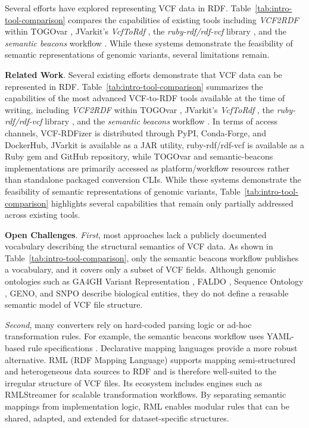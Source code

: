 \documentclass[unnumsec,webpdf,contemporary,large]{oup-authoring-template}
\begin{document}
Several efforts have explored representing VCF data in RDF. 
Table~\ref{tab:intro-tool-comparison} compares the capabilities of existing tools including \textit{VCF2RDF} within TOGOvar \cite{togovar_2022}, JVarkit’s \textit{VcfToRdf} \cite{JVarkit_2015}, the \textit{ruby-rdf/rdf-vcf} library \cite{ruby_rdf_vcf}, and the \textit{semantic beacons} workflow \cite{semantic_beac_2025}. 
While these systems demonstrate the feasibility of semantic representations of genomic variants, several limitations remain.


\textbf{Related Work}.
Several existing efforts demonstrate that VCF data can be represented in RDF. 
Table~\ref{tab:intro-tool-comparison} summarizes the capabilities of the most advanced VCF-to-RDF tools available at the time of writing, including \textit{VCF2RDF} within TOGOvar \cite{togovar_2022}, JVarkit’s \textit{VcfToRdf} \cite{JVarkit_2015}, the \textit{ruby-rdf/rdf-vcf} library \cite{ruby_rdf_vcf}, and the \textit{semantic beacons} workflow \cite{semantic_beac_2025}. 
In terms of access channels, VCF-RDFizer is distributed through PyPI, Conda-Forge, and DockerHub, JVarkit is available as a JAR utility, ruby-rdf/rdf-vcf is available as a Ruby gem and GitHub repository, while TOGOvar and semantic-beacons implementations are primarily accessed as platform/workflow resources rather than standalone packaged conversion CLIs.
While these systems demonstrate the feasibility of semantic representations of genomic variants, Table~\ref{tab:intro-tool-comparison} highlights several capabilities that remain only partially addressed across existing tools.

\textbf{Open Challenges}.
\textit{First}, most approaches lack a publicly documented vocabulary describing the structural semantics of VCF data. 
As shown in Table~\ref{tab:intro-tool-comparison}, only the semantic beacons workflow publishes a vocabulary, and it covers only a subset of VCF fields. 
Although genomic ontologies such as GA4GH Variant Representation \cite{ga4gh_varschema_2021}, FALDO \cite{faldo_2016}, Sequence Ontology \cite{seq_ont_2005}, GENO, and SNPO describe biological entities, they do not define a reusable semantic model of VCF file structure.

\textit{Second}, many converters rely on hard-coded parsing logic or ad-hoc transformation rules. 
For example, the semantic beacons workflow uses YAML-based rule specifications \cite{yaml-spec_2025}. 
Declarative mapping languages provide a more robust alternative. 
RML (RDF Mapping Language) \cite{rml_2024} supports mapping semi-structured and heterogeneous data sources to RDF and is therefore well-suited to the irregular structure of VCF files. 
Its ecosystem includes engines such as RMLStreamer \cite{rmlstreamer_2022} for scalable transformation workflows. 
By separating semantic mappings from implementation logic, RML enables modular rules that can be shared, adapted, and extended for dataset-specific structures.
\end{document}
